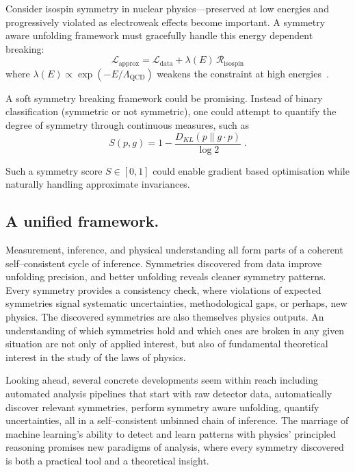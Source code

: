         Consider isospin symmetry in nuclear physics---preserved at low energies and progressively violated as electroweak effects become important.
        A symmetry aware unfolding framework must gracefully handle this energy dependent breaking:
        \[
            \mathcal{L}_{\text{approx}} = \mathcal{L}_{\text{data}} + \lambda(E) \,\mathcal{R}_{\text{isospin}}
        \]
        where \(\lambda(E) \propto \exp(-E/\Lambda_{\text{QCD}})\) weakens the constraint at high energies~\cite{Chreim:2023tvs}.
    
        A soft symmetry breaking framework could be promising.
        Instead of binary classification (symmetric or not symmetric), one could attempt to quantify the degree of symmetry through continuous measures, such as 
        \[
            S(p, g) = 1 - \frac{D_{KL}(p \| g \cdot p)}{\log 2}\;.
        \]
        
        Such a symmetry score \(S \in [0,1]\) could enable gradient based optimisation while naturally handling approximate invariances.
    
    \subsection{A unified framework.}
        Measurement, inference, and physical understanding all form parts of a coherent self--consistent cycle of inference.
        Symmetries discovered from data improve unfolding precision, and better unfolding reveals cleaner symmetry patterns.
        Every symmetry provides a consistency check, where violations of expected symmetries signal systematic uncertainties, methodological gaps, or perhaps, new physics.
        The discovered symmetries are also themselves physics outputs.
        An understanding of which symmetries hold and which ones are broken in any given situation are not only of applied interest, but also of fundamental theoretical interest in the study of the laws of physics.
    
        Looking ahead, several concrete developments seem within reach including automated analysis pipelines that start with raw detector data, automatically discover relevant symmetries, perform symmetry aware unfolding, quantify uncertainties, all in a self--consistent unbinned chain of inference.
        The marriage of machine learning's ability to detect and learn patterns with physics' principled reasoning promises new paradigms of analysis, where every symmetry discovered is both a practical tool and a theoretical insight.
